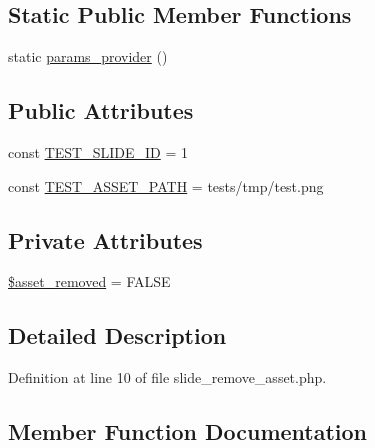 \subsection*{Static Public Member Functions}
\begin{DoxyCompactItemize}
\item 
static \hyperlink{classlibresignage_1_1tests_1_1api_1_1endpoint_1_1slide_1_1asset_1_1slide__remove__asset_aa07a0f62cd901c31452a322ac09ea144}{params\+\_\+provider} ()
\end{DoxyCompactItemize}
\subsection*{Public Attributes}
\begin{DoxyCompactItemize}
\item 
const \hyperlink{classlibresignage_1_1tests_1_1api_1_1endpoint_1_1slide_1_1asset_1_1slide__remove__asset_ac3fc483299cbacc19a62456b52b98fb9}{T\+E\+S\+T\+\_\+\+S\+L\+I\+D\+E\+\_\+\+ID} = \textquotesingle{}1\textquotesingle{}
\item 
const \hyperlink{classlibresignage_1_1tests_1_1api_1_1endpoint_1_1slide_1_1asset_1_1slide__remove__asset_a6666fc2e8b37309899415bd20db8a683}{T\+E\+S\+T\+\_\+\+A\+S\+S\+E\+T\+\_\+\+P\+A\+TH} = \textquotesingle{}tests/tmp/test.\+png\textquotesingle{}
\end{DoxyCompactItemize}
\subsection*{Private Attributes}
\begin{DoxyCompactItemize}
\item 
\hyperlink{classlibresignage_1_1tests_1_1api_1_1endpoint_1_1slide_1_1asset_1_1slide__remove__asset_a1fd5d25f60b8a43b841a5ad602fefd19}{\$asset\+\_\+removed} = F\+A\+L\+SE
\end{DoxyCompactItemize}


\subsection{Detailed Description}


Definition at line 10 of file slide\+\_\+remove\+\_\+asset.\+php.



\subsection{Member Function Documentation}
\mbox{\label{classlibresignage_1_1tests_1_1api_1_1endpoint_1_1slide_1_1asset_1_1slide__remove__asset_aa07a0f62cd901c31452a322ac09ea144}} 
